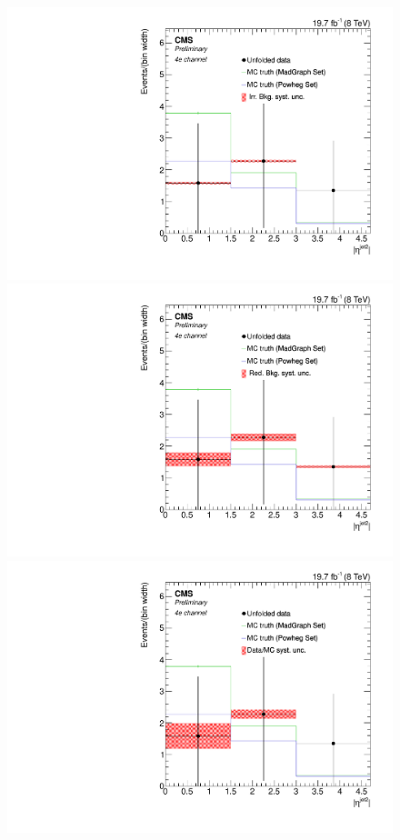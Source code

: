 \begin{figure}[hbtp]
\begin{center}
   \includegraphics[width=0.8\cmsFigWidth]{Figures/Unfolding/Systematics/ZZTo4e_EtaJet2_IrrBkg_Mad_fr}
   \includegraphics[width=0.8\cmsFigWidth]{Figures/Unfolding/Systematics/ZZTo4e_EtaJet2_RedBkg_Mad_fr}     
  \includegraphics[width=0.8\cmsFigWidth]{Figures/Unfolding/Systematics/ZZTo4e_EtaJet2_UnfDataOverGenMC_Mad_fr}     

\end{center}
\end{figure}
